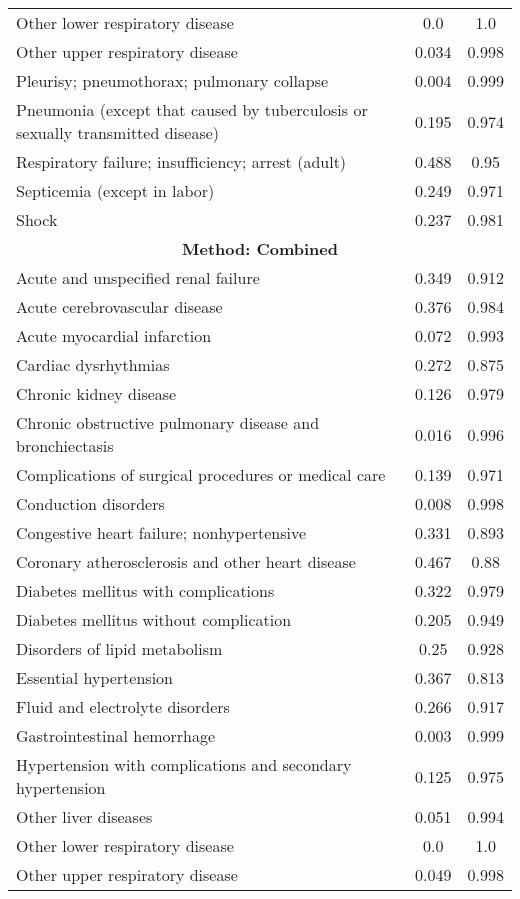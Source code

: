 \documentclass{article}
\begin{document}
\begin{longtable}{lcc}
Other lower respiratory disease & 0.0 & 1.0 \\
Other upper respiratory disease & 0.034 & 0.998 \\
Pleurisy; pneumothorax; pulmonary collapse & 0.004 & 0.999 \\
Pneumonia (except that caused by tuberculosis or sexually transmitted disease) & 0.195 & 0.974 \\
Respiratory failure; insufficiency; arrest (adult) & 0.488 & 0.95 \\
Septicemia (except in labor) & 0.249 & 0.971 \\
Shock & 0.237 & 0.981 \\
\midrule
\multicolumn{3}{c}{\textbf{Method: Combined}} \\
\midrule
Acute and unspecified renal failure & 0.349 & 0.912 \\
Acute cerebrovascular disease & 0.376 & 0.984 \\
Acute myocardial infarction & 0.072 & 0.993 \\
Cardiac dysrhythmias & 0.272 & 0.875 \\
Chronic kidney disease & 0.126 & 0.979 \\
Chronic obstructive pulmonary disease and bronchiectasis & 0.016 & 0.996 \\
Complications of surgical procedures or medical care & 0.139 & 0.971 \\
Conduction disorders & 0.008 & 0.998 \\
Congestive heart failure; nonhypertensive & 0.331 & 0.893 \\
Coronary atherosclerosis and other heart disease & 0.467 & 0.88 \\
Diabetes mellitus with complications & 0.322 & 0.979 \\
Diabetes mellitus without complication & 0.205 & 0.949 \\
Disorders of lipid metabolism & 0.25 & 0.928 \\
Essential hypertension & 0.367 & 0.813 \\
Fluid and electrolyte disorders & 0.266 & 0.917 \\
Gastrointestinal hemorrhage & 0.003 & 0.999 \\
Hypertension with complications and secondary hypertension & 0.125 & 0.975 \\
Other liver diseases & 0.051 & 0.994 \\
Other lower respiratory disease & 0.0 & 1.0 \\
Other upper respiratory disease & 0.049 & 0.998 \\

\end{longtable}
\end{document}
